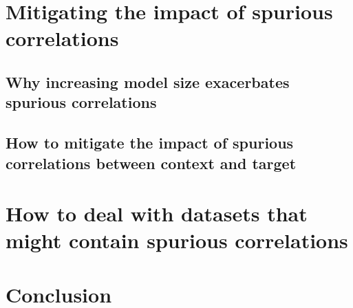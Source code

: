 \documentclass{article}
\begin{document}
\section{Mitigating the impact of spurious correlations}
\subsection{Why increasing model size exacerbates spurious correlations}
\subsection{How to mitigate the impact of spurious correlations between context and target}

\section{How to deal with datasets that might contain spurious correlations}

\section{Conclusion}
\end{document}
